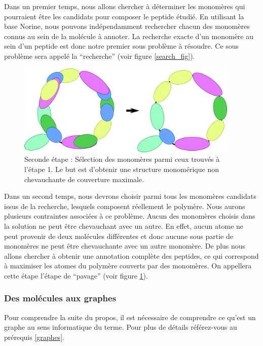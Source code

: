 Dans un premier temps, nous allons chercher à déterminer les monomères qui pourraient être les candidats pour composer le peptide étudié.
En utilisant la base Norine, nous pouvons indépendamment rechercher chacun des monomères connus au sein de la molécule à annoter.
La recherche exacte d'un monomère au sein d'un peptide est donc notre premier sous problème à résoudre.
Ce sous problème sera appelé la ``recherche'' (voir figure \ref{search_fig}).

\begin{figure}[!ht]
  \begin{center}
    \includegraphics[width=400px]{Figures/s2m/Intro/tiling.png}
    \caption{\label{tiling_fig}Seconde étape : Sélection des monomères parmi ceux trouvés à l'étape 1.
    Le but est d'obtenir une structure monomérique non chevauchante de couverture maximale.}
  \end{center}
\end{figure}

Dans un second temps, nous devrons choisir parmi tous les monomères candidats issus de la recherche, lesquels composent réellement le polymère.
Nous aurons plusieurs contraintes associées à ce problème.
Aucun des monomères choisis dans la solution ne peut être chevauchant avec un autre.
En effet, aucun atome ne peut provenir de deux molécules différentes et donc aucune sous partie de monomères ne peut être chevauchante avec un autre monomère.
De plus nous allons chercher à obtenir une annotation complète des peptides, ce qui correspond à maximiser les atomes du polymère couverts par des monomères.
On appellera cette étape l'étape de ``pavage'' (voir figure \ref{tiling_fig}).

\subsubsection{Des molécules aux graphes}

Pour comprendre la suite du propos, il est nécessaire de comprendre ce qu'est un graphe au sens informatique du terme.
Pour plus de détails référez-vous au prérequis \ref{graphes}.



